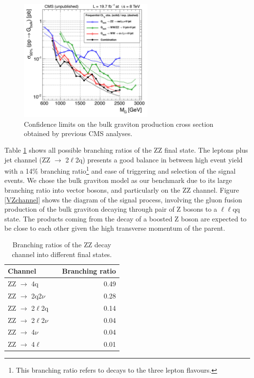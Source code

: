 \begin{figure}[h]
\begin{center}
\includegraphics[width=0.6\textwidth]{figures/objects/CMS_comparison-s.jpg}
\caption[Combine limit at Run 1]{Confidence limits on the bulk graviton production cross section obtained by previous CMS analyses.}
\label{2012result}
\end{center}
\end{figure}

 Table \ref{branTable} shows all possible branching ratios of the ZZ final state. The leptons plus jet channel (ZZ $\to$ 2$\ell$2q) presents a good balance in between high event yield with a 14\% branching ratio\footnote{This branching ratio refers to decays to the three lepton flavours.} and ease of triggering and selection of the signal events. We chose the bulk graviton model as our benchmark due to its large branching ratio into vector bosons, and particularly on the ZZ channel. Figure \ref{VZchannel} shows the diagram of the signal process, involving the gluon fusion production of the bulk graviton decaying through pair of Z bosons to a $\ell\ell$qq state. The products coming from the decay of a boosted Z boson are expected to be close to each other given the high transverse momentum of the parent. 


\begin{table}[h!]
\begin{center}
\caption[Branching ratios]{Branching ratios of the ZZ decay channel into different final states.}
\label{branTable}
\begin{tabular}{lcr}
\hline
\textbf{Channel} & \phantom{xxx}  &\textbf{Branching ratio} \\ \hline
ZZ $\to$ 4q & \phantom{xxx} & 0.49 \\
ZZ $\to$ 2q2$\nu$ & \phantom{xxx} & 0.28 \\
ZZ $\to$ 2$\ell$2q & \phantom{xxx} & 0.14\\
ZZ $\to$ 2$\ell$2$\nu$ & \phantom{xxx} & 0.04 \\
ZZ $\to$ 4$\nu$ & \phantom{xxx} & 0.04 \\
ZZ $\to$ 4$\ell$ & \phantom{xxx} & 0.01 \\
\hline
\end{tabular}
\end{center}
\end{table}

